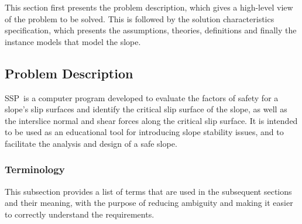 \documentclass[12pt]{article}
\newcommand{\progname}{SSP}
\begin{document}
This section first presents the problem description, which gives a
high-level view of the problem to be solved.  This is followed by the
solution characteristics specification, which presents the
assumptions, theories, definitions and finally the instance models
that model the slope. \\

\subsection{Problem Description} \label{Sec_pd}

\progname\ is a computer program developed to evaluate the factors of safety 
for a slope's slip surfaces and identify the critical slip surface of the 
slope, as well as the interslice normal and shear forces along the critical 
slip surface. It is intended to be used as an educational tool for introducing 
slope stability issues, and to facilitate the analysis and design of a safe 
slope.

\subsubsection{Terminology}

This subsection provides a list of terms that are used in the subsequent
sections and their meaning, with the purpose of reducing ambiguity and
 making it easier to correctly understand the requirements.
\end{document}
